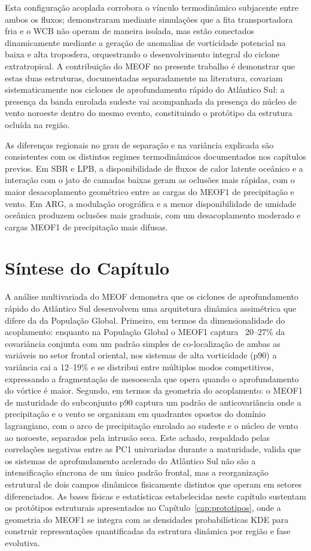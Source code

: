 Esta configuração acoplada corrobora o vínculo termodinâmico subjacente entre ambos os fluxos; \citet{schemm2014ccb} demonstraram mediante simulações que a fita transportadora fria e o WCB não operam de maneira isolada, mas estão conectados dinamicamente mediante a geração de anomalias de vorticidade potencial na baixa e alta troposfera, orquestrando o desenvolvimento integral do ciclone extratropical.
A contribuição do MEOF no presente trabalho é demonstrar que estas duas estruturas, documentadas separadamente na literatura, covariam sistematicamente nos ciclones de aprofundamento rápido do Atlântico Sul: a presença da banda enrolada sudeste vai acompanhada da presença do núcleo de vento noroeste dentro do mesmo evento, constituindo o protótipo da estrutura ocluída na região.

As diferenças regionais no grau de separação e na variância explicada são consistentes com os distintos regimes termodinâmicos documentados nos capítulos previos. Em SBR e LPB, a disponibilidade de fluxos de calor latente oceânico e a interação com o jato de camadas baixas \citep{gramcianinov2019properties} geram as oclusões mais rápidas, com o maior desacoplamento geométrico entre as cargas do MEOF1 de precipitação e vento. Em ARG, a modulação orográfica e a menor disponibilidade de umidade oceânica produzem oclusões mais graduais, com um desacoplamento moderado e cargas MEOF1 de precipitação mais difusas.

\section{Síntese do Capítulo}
\label{sec:sintesis_meof}

A análise multivariada do MEOF demonstra que os ciclones de aprofundamento rápido do Atlântico Sul desenvolvem uma arquitetura dinâmica assimétrica que difere da da População Global.
Primeiro, em termos da dimensionalidade do acoplamento: enquanto na População Global o MEOF1 captura ~20--27\% da covariância conjunta com um padrão simples de co-localização de ambas as variáveis no setor frontal oriental, nos sistemas de alta vorticidade (p90) a variância cai a 12--19\% e se distribui entre múltiplos modos competitivos, expressando a fragmentação de mesoescala que opera quando o aprofundamento do vórtice é maior.
Segundo, em termos da geometria do acoplamento: o MEOF1 de maturidade do subconjunto p90 captura um padrão de anticovariância onde a precipitação e o vento se organizam em quadrantes opostos do domínio lagrangiano, com o arco de precipitação enrolado ao sudeste e o núcleo de vento ao noroeste, separados pela intrusão seca.
Este achado, respaldado pelas correlações negativas entre as PC1 univariadas durante a maturidade, valida que os sistemas de aprofundamento acelerado do Atlântico Sul não são a intensificação síncrona de um único padrão frontal, mas a reorganização estrutural de dois campos dinâmicos fisicamente distintos que operam em setores diferenciados.
As bases físicas e estatísticas estabelecidas neste capítulo sustentam os protótipos estruturais apresentados no Capítulo~\ref{cap:prototipos}, onde a geometria do MEOF1 se integra com as densidades probabilísticas KDE para construir representações quantificadas da estrutura dinâmica por região e fase evolutiva.